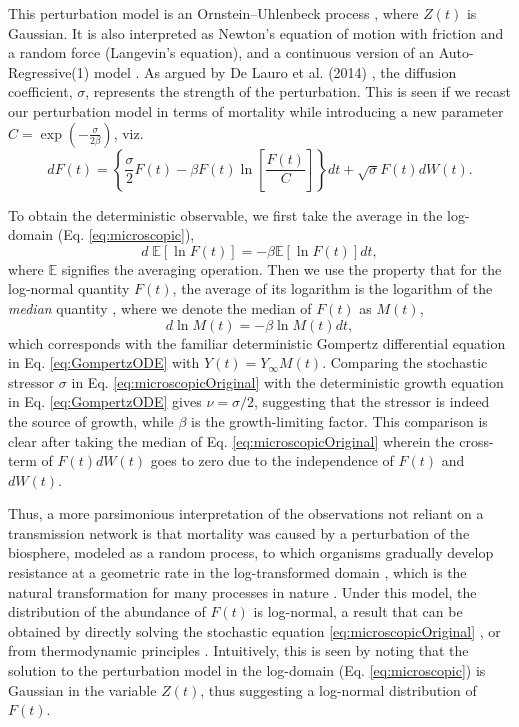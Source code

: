 \documentclass{article}
\begin{document}
This perturbation model is an Ornstein–Uhlenbeck process \cite{risken1996fokker}, where $Z(t)$ is Gaussian. It is also interpreted as Newton's equation of motion with friction and a random force (Langevin's equation), and a continuous version of an Auto-Regressive(1) model \cite{akaike1970statistical}. As argued by De Lauro et al. (2014) \cite{de2014stochastic}, the diffusion coefficient, $\sigma$, represents the strength of the perturbation. This is seen if we recast our perturbation model in terms of mortality while introducing a new parameter $C=\exp{(-\frac{\sigma}{2\beta})}$, viz. 
\begin{equation}
\label{eq:microscopicOriginal}
dF(t) = \left\{\frac{\sigma}{2}F(t) - \beta F(t)\ln\left[\frac{F(t)}{C}\right]\right\}dt + \sqrt{\sigma}F(t)dW(t).
\end{equation}

To obtain the deterministic observable, we first take the average in the log-domain (Eq. \ref{eq:microscopic}), 
\begin{equation}
d \;\mathbb E[\ln{F(t)}] = -\beta \mathbb E[\ln{F(t)}] dt,
\end{equation}
where $\mathbb E$ signifies the averaging operation.
Then we use the property that for the log-normal quantity $F(t)$, the average of its logarithm is the logarithm of the \emph{median} quantity \cite{petroni2020gompertz}, where we denote the median of $F(t)$ as $M(t)$, 
\begin{equation}
\label{eq:medianGomp}
d\ln{M(t)} = -\beta \ln{M(t)} dt,
\end{equation}
which corresponds with the familiar deterministic Gompertz differential equation in Eq. \ref{eq:GompertzODE} with $Y(t) = Y_\infty M(t)$. 
Comparing the stochastic stressor $\sigma$ in Eq. \ref{eq:microscopicOriginal} with the deterministic growth equation in Eq. \ref{eq:GompertzODE} gives $\nu=\sigma/2$, suggesting that the stressor is indeed the source of growth, while $\beta$ is the growth-limiting factor. This comparison is clear after taking the median of Eq. \ref{eq:microscopicOriginal} wherein the cross-term of $F(t)dW(t)$ goes to zero due to the independence of $F(t)$ and $dW(t)$.

Thus, a more parsimonious interpretation of the observations not reliant on a transmission network is that mortality was caused by a perturbation of the biosphere, modeled as a random process, to which organisms gradually develop resistance at a geometric rate in the log-transformed domain \cite{boxenbaum2017hypotheses,neafsey1988gompertz}, which is the natural transformation for many processes in nature \cite{zhang1994log}. 
Under this model, the distribution of the abundance of $F(t)$ is log-normal, a result that can be obtained by directly solving the stochastic equation \ref{eq:microscopicOriginal} \cite{skiadas2010exact,petroni2020gompertz}, or from thermodynamic principles \cite{sitaram1984statistical,gunasekaran1982lon,chakrabarti1996non}. 
Intuitively, this is seen by noting that the solution to the perturbation model in the log-domain (Eq. \ref{eq:microscopic}) is Gaussian in the variable $Z(t)$, thus suggesting a log-normal distribution of $F(t)$.
\end{document}
